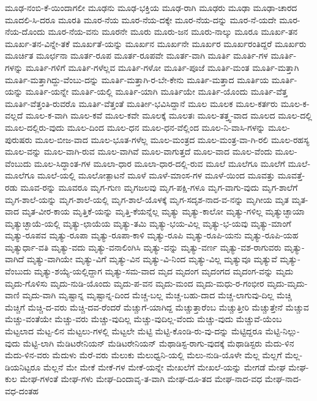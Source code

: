 {ಮೂಢ-ನಂಬಿ-ಕೆ-ಯಿಂದಾಗಲೀ
ಮೂಢನು
ಮೂಢ-ಭಕ್ತಿಯ
ಮೂಢ-ರಾಗಿ
ಮೂಢರು
ಮೂಢಾ
ಮೂಢಾ-ಚಾರದ
ಮೂದಲಿ-ಸಿ-ದರೂ
ಮೂರತಿ
ಮೂರ-ನೆಯ
ಮೂರ-ನೆಯ-ದಕ್ಕೇ
ಮೂರ-ನೆಯ-ದನ್ನು
ಮೂರ-ನೆ-ಯದೇ
ಮೂರ-ನೆಯ-ದೊಂದು
ಮೂರ-ನೆಯ-ವನು
ಮೂರನೇ
ಮೂರು
ಮೂರು-ಜನ
ಮೂರು-ನಾಲ್ಕು
ಮೂರೂ
ಮೂರ್ಖ-ತನ
ಮೂರ್ಖ-ತನ-ವಿನ್ನೇ-ತಕೆ
ಮೂರ್ಖತೆ-ಯನ್ನು
ಮೂರ್ಖನ
ಮೂರ್ಖನೇ
ಮೂರ್ಖರ
ಮೂರ್ಖರಂತಿದ್ದರೆ
ಮೂರ್ಖರು
ಮೂರ್ಚಿತ
ಮೂರ್ಛನಾ
ಮೂರ್ತ-ರೂಪ
ಮೂರ್ತ-ರೂಪವೇ
ಮೂರ್ತ-ವಾಗಿ
ಮೂರ್ತಿ
ಮೂರ್ತಿ-ಗಳ
ಮೂರ್ತಿ-ಗಳನ್ನು
ಮೂರ್ತಿ-ಗಳಿಗೆ
ಮೂರ್ತಿ-ಗಳೆಲ್ಲವ
ಮೂರ್ತಿ-ಗಳೋ
ಮೂರ್ತಿ-ಪೂಜೆ
ಮೂರ್ತಿ-ಮಂತ
ಮೂರ್ತಿ-ಮತ್ತಾಗಿ
ಮೂರ್ತಿ-ಮತ್ತಾಗಿದ್ದು-ವೆಂಬು-ದನ್ನು
ಮೂರ್ತಿ-ಮತ್ತಾಗಿ-ರ-ಬೇ-ಕೇನು
ಮೂರ್ತಿ-ಮತ್ತಾದ
ಮೂರ್ತಿಯ
ಮೂರ್ತಿ-ಯನ್ನು
ಮೂರ್ತಿ-ಯನ್ನೇ
ಮೂರ್ತಿ-ಯಲ್ಲಿ
ಮೂರ್ತಿ-ಯಾಗಿ
ಮೂರ್ತಿಯೇ
ಮೂರ್ತಿ-ಯೊಂದು
ಮೂರ್ತಿ-ವೆತ್ತ
ಮೂರ್ತಿ-ವೆತ್ತಂತಿ-ರುವರೊ
ಮೂರ್ತಿ-ವೆತ್ತಂತೆ
ಮೂರ್ತೀ-ಭವಿಸಿದ್ದಾನೆ
ಮೂಲ
ಮೂಲಕ
ಮೂಲ-ಕರ್ತರು
ಮೂಲ-ಕ-ವಲ್ಲದೆ
ಮೂಲ-ಕ-ವಾಗಿ
ಮೂಲ-ಕವೆ
ಮೂಲ-ಕವೇ
ಮೂಲಕ್ಕೆ
ಮೂಲತಃ
ಮೂಲ-ತತ್ತ್ವ-ವಾದ
ಮೂಲದ
ಮೂಲ-ದಲ್ಲಿ
ಮೂಲ-ದಲ್ಲಿರು-ವುದು
ಮೂಲ-ದಿಂದ
ಮೂಲ-ಧನ
ಮೂಲ-ಧನ-ವೆಲ್ಲಿಂದ
ಮೂಲ-ನಿ-ವಾಸಿ-ಗಳನ್ನು
ಮೂಲ-ಪುರುಷರು
ಮೂಲ-ಬೀಜ-ವಾದ
ಮೂಲ-ಭೂತ-ಗಳೆಲ್ಲ
ಮೂಲ-ಮಂತ್ರದ
ಮೂಲ-ಮಂತ್ರ-ವಾ-ಗಿ-ರಲಿ
ಮೂಲ-ರಹಸ್ಯ
ಮೂಲ-ವನ್ನು
ಮೂಲ-ವಾಗಿ-ರುವ
ಮೂಲ-ವಾಗಿವೆ
ಮೂಲ-ವಾಗುತ್ತದೆ
ಮೂಲ-ವಾದ
ಮೂಲ-ವೆಂದು
ಮೂಲ-ವೆಂಬುದು
ಮೂಲ-ಸಿದ್ಧಾಂತ-ಗಳ
ಮೂಲಾ-ಧಾರ
ಮೂಲಾ-ಧಾರ-ದಲ್ಲಿ-ರುವ
ಮೂಲೆ
ಮೂಲೆಗೂ
ಮೂಲೆಗೆ
ಮೂಲೆ-ಮೂಲೆಗೂ
ಮೂಲೆ-ಯಲ್ಲಿ
ಮೂಲೋತ್ಪಾಟನೆ
ಮೂಳೆ
ಮೂಳೆ-ಮಾಂಸ-ಗಳ
ಮೂಳೆ-ಯಿಂದ
ಮೂವತ್ತು
ಮೂವತ್ತೆ-ರಡು
ಮೂವ-ರನ್ನು
ಮೂವರೂ
ಮೃಗ-ಗುಣ
ಮೃಗಜಲವು
ಮೃಗ-ಪಕ್ಷಿ-ಗಳೂ
ಮೃಗ-ವಾಗು-ವುದು
ಮೃಗ-ಶಾಲೆಗೆ
ಮೃಗ-ಶಾಲೆ-ಯನ್ನು
ಮೃಗ-ಶಾಲೆ-ಯಲ್ಲಿ
ಮೃಗ-ಶಾಲೆ-ಯೊಳಕ್ಕೆ
ಮೃಗ-ಸದೃಶ-ನಾದ-ವ-ನನ್ನು
ಮೃಗೀಯ
ಮೃತ
ಮೃತ-ವಾದ
ಮೃತ-ವೀರ-ಕಾಯ
ಮೃತ್ತಿಕೆ-ಯನ್ನು
ಮೃತ್ತಿ-ಕೆಯನ್ನೆಲ್ಲ
ಮೃತ್ಯು
ಮೃತ್ಯು-ಕಾಲೋ
ಮೃತ್ಯು-ಗಳಿಲ್ಲ
ಮೃತ್ಯುಚ್ಛಾಯಾ
ಮೃತ್ಯುಚ್ಛಾಯೆ-ಯಲ್ಲಿ
ಮೃತ್ಯು-ಛಾಯೆಯ
ಮೃತ್ಯು-ತಮಿ
ಮೃತ್ಯು-ಭಯ-ವಿಲ್ಲ
ಮೃತ್ಯು-ಭ-ಯವು
ಮೃತ್ಯು-ಮಾಂಗೆ
ಮೃತ್ಯು-ರೂಪವ
ಮೃತ್ಯು-ರೂಪಾ
ಮೃತ್ಯು-ರೂಪಾ-ಕಾಳಿ
ಮೃತ್ಯು-ರೂಪಿ
ಮೃತ್ಯು-ರೂಪಿ-ಯನು
ಮೃತ್ಯು-ರೂಪಿ-ಯಹ
ಮೃತ್ಯುರ್ಧಾ-ವತಿ
ಮೃತ್ಯು-ವದು
ಮೃತ್ಯು-ವನಾಲಿಂಗಿಸಿ
ಮೃತ್ಯು-ವನ್ನು
ಮೃತ್ಯು-ವರ್ಣ
ಮೃತ್ಯು-ವಶ-ರಾಗುವರು
ಮೃತ್ಯು-ವಾಗಿದೆ
ಮೃತ್ಯು-ವಾಗಿಯೇ
ಮೃತ್ಯು-ವಿಗೆ
ಮೃತ್ಯು-ವಿನ
ಮೃತ್ಯು-ವಿ-ನಿಂದ
ಮೃತ್ಯು-ವಿಲ್ಲ
ಮೃತ್ಯುವೂ
ಮೃತ್ಯುವೆ
ಮೃತ್ಯು-ವೆಂಬುದು
ಮೃತ್ಯು-ಶಯ್ಯೆ-ಯಲ್ಲಿದ್ದಾಗ
ಮೃತ್ಯು-ಸಮ-ವಾದ
ಮೃದ
ಮೃದಂಗ
ಮೃದಂಗದ
ಮೃದಂಗ-ವನ್ನು
ಮೃದು
ಮೃದು-ಗೊಳಿಸು
ಮೃದು-ನುಡಿ-ಯೊಂದು
ಮೃದು-ಪ-ವನ
ಮೃದು-ಮಂದ
ಮೃದು-ಮಧು-ರ-ಗಂಭೀರ
ಮೃದು-ಮೃದು-ವಾಣಿ
ಮೃದು-ವಾಗಿ
ಮೃಷ್ಟಾನ್ನ
ಮೃಷ್ಟಾನ್ನ-ದಿಂದ
ಮೆಚ್ಚ-ಬಲ್ಲ
ಮೆಚ್ಚ-ಬಹು-ದಾದ
ಮೆಚ್ಚ-ಲಾಗುವು-ದಿಲ್ಲ
ಮೆಚ್ಚಿ
ಮೆಚ್ಚಿಗೆ
ಮೆಚ್ಚಿ-ದ-ವರು
ಮೆಚ್ಚಿ-ದವ-ರೆಂದರೆ
ಮೆಚ್ಚುಗೆ-ಯಾಗಿದ್ದ
ಮೆಚ್ಚುತ್ತಾರೆಂಬ
ಮೆಚ್ಚುತ್ತೀರಿ
ಮೆಚ್ಚುತ್ತೇನೆ
ಮೆಚ್ಚುವ
ಮೆಚ್ಚು-ವಂತೆಯೇ
ಮೆಚ್ಚು-ವರು
ಮೆಚ್ಚು-ವುದಿಲ್ಲ
ಮೆಚ್ಚು-ವುದಿಲ್ಲ-ವೆಂದು
ಮೆಚ್ಚು-ವುದು
ಮೆಚ್ಚುವೆ-ಯೆಂಬ
ಮೆಟ್ಟಲಾದ
ಮೆಟ್ಟ-ಲಿನ
ಮೆಟ್ಟಲು-ಗಳಲ್ಲಿ
ಮೆಟ್ಟಲೇ
ಮೆಟ್ಟಿ
ಮೆಟ್ಟಿ-ಕೊಂಡಿ-ರು-ವು-ದನ್ನು
ಮೆಟ್ಟಿದ್ದರೂ
ಮೆಟ್ಟಿ-ನಿಲ್ಲು-ವುದು
ಮೆಟ್ಟಿ-ಲಾಗಿ
ಮೆಡಿಟರೇನಿಯನ್
ಮೆಡಿಟರೇನಿಯನ್
ಮೆಥಾಡಿಸ್ಟ-ರಾಗು-ವುದಕ್ಕೆ
ಮೆಥಾಡಿಸ್ಟರು
ಮೆದು-ಳಿನ
ಮೆದು-ಳಿನ-ವರು
ಮೆದುಳು
ಮೆರೆ-ವರು
ಮೆಲುಕು
ಮೆಲುಧ್ವನಿ-ಯಲ್ಲಿ
ಮೆಲು-ನುಡಿ-ಯೊಳೇ
ಮೆಲ್ಲ
ಮೆಲ್ಲಗೆ
ಮೆಲ್ಲ-ಡಿಯನಿಟ್ಟರೂ
ಮೆಲ್ಲನೆ
ಮೇ
ಮೇಕೆ
ಮೇಕೆ-ಗಳ
ಮೇಕೆ-ಯನ್ನೇ
ಮೇಖಲೆಗೆ
ಮೇಖಲೆ-ಯನ್ನು
ಮೇಗಡೆ
ಮೇಘ
ಮೇಘ-ಕುಲ
ಮೇಘ-ಗಳಂತೆ
ಮೇಘ-ಗಳು
ಮೇಘ-ದಿಂದಾವೃ-ತ-ವಾಗಿ
ಮೇಘ-ದೂ-ತದ
ಮೇಘ-ನಾದ-ವಧ
ಮೇಘ-ನಾದ-ವಧ-ದಂತಹ
}
